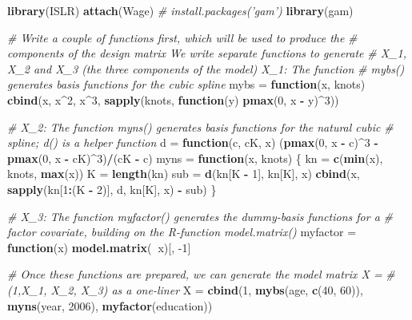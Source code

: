 \documentclass[]{article}
\newenvironment{Shaded}{\begin{snugshade}}{\end{snugshade}}
\newcommand{\CommentTok}[1]{\textcolor[rgb]{0.56,0.35,0.01}{\textit{#1}}}
\newcommand{\ControlFlowTok}[1]{\textcolor[rgb]{0.13,0.29,0.53}{\textbf{#1}}}
\newcommand{\DecValTok}[1]{\textcolor[rgb]{0.00,0.00,0.81}{#1}}
\newcommand{\KeywordTok}[1]{\textcolor[rgb]{0.13,0.29,0.53}{\textbf{#1}}}
\newcommand{\NormalTok}[1]{#1}
\newcommand{\OperatorTok}[1]{\textcolor[rgb]{0.81,0.36,0.00}{\textbf{#1}}}
\newcommand{\StringTok}[1]{\textcolor[rgb]{0.31,0.60,0.02}{#1}}
\begin{document}
\begin{Shaded}
\begin{Highlighting}[]
\KeywordTok{library}\NormalTok{(ISLR)}
\KeywordTok{attach}\NormalTok{(Wage)}
\CommentTok{# install.packages('gam')}
\KeywordTok{library}\NormalTok{(gam)}

\CommentTok{# Write a couple of functions first, which will be used to produce the}
\CommentTok{# components of the design matrix We write separate functions to generate}
\CommentTok{# X_1, X_2 and X_3 (the three components of the model) X_1: The function}
\CommentTok{# mybs() generates basis functions for the cubic spline}
\NormalTok{mybs =}\StringTok{ }\ControlFlowTok{function}\NormalTok{(x, knots) }\KeywordTok{cbind}\NormalTok{(x, x}\OperatorTok{^}\DecValTok{2}\NormalTok{, x}\OperatorTok{^}\DecValTok{3}\NormalTok{, }\KeywordTok{sapply}\NormalTok{(knots, }\ControlFlowTok{function}\NormalTok{(y) }\KeywordTok{pmax}\NormalTok{(}\DecValTok{0}\NormalTok{, }
\NormalTok{    x }\OperatorTok{-}\StringTok{ }\NormalTok{y)}\OperatorTok{^}\DecValTok{3}\NormalTok{))}

\CommentTok{# X_2: The function myns() generates basis functions for the natural cubic}
\CommentTok{# spline; d() is a helper function}
\NormalTok{d =}\StringTok{ }\ControlFlowTok{function}\NormalTok{(c, cK, x) (}\KeywordTok{pmax}\NormalTok{(}\DecValTok{0}\NormalTok{, x }\OperatorTok{-}\StringTok{ }\NormalTok{c)}\OperatorTok{^}\DecValTok{3} \OperatorTok{-}\StringTok{ }\KeywordTok{pmax}\NormalTok{(}\DecValTok{0}\NormalTok{, x }\OperatorTok{-}\StringTok{ }\NormalTok{cK)}\OperatorTok{^}\DecValTok{3}\NormalTok{)}\OperatorTok{/}\NormalTok{(cK }\OperatorTok{-}\StringTok{ }\NormalTok{c)}
\NormalTok{myns =}\StringTok{ }\ControlFlowTok{function}\NormalTok{(x, knots) \{}
\NormalTok{    kn =}\StringTok{ }\KeywordTok{c}\NormalTok{(}\KeywordTok{min}\NormalTok{(x), knots, }\KeywordTok{max}\NormalTok{(x))}
\NormalTok{    K =}\StringTok{ }\KeywordTok{length}\NormalTok{(kn)}
\NormalTok{    sub =}\StringTok{ }\KeywordTok{d}\NormalTok{(kn[K }\OperatorTok{-}\StringTok{ }\DecValTok{1}\NormalTok{], kn[K], x)}
    \KeywordTok{cbind}\NormalTok{(x, }\KeywordTok{sapply}\NormalTok{(kn[}\DecValTok{1}\OperatorTok{:}\NormalTok{(K }\OperatorTok{-}\StringTok{ }\DecValTok{2}\NormalTok{)], d, kn[K], x) }\OperatorTok{-}\StringTok{ }\NormalTok{sub)}
\NormalTok{\}}

\CommentTok{# X_3: The function myfactor() generates the dummy-basis functions for a}
\CommentTok{# factor covariate, building on the R-function model.matrix()}
\NormalTok{myfactor =}\StringTok{ }\ControlFlowTok{function}\NormalTok{(x) }\KeywordTok{model.matrix}\NormalTok{(}\OperatorTok{~}\NormalTok{x)[, }\DecValTok{-1}\NormalTok{]}

\CommentTok{# Once these functions are prepared, we can generate the model matrix X =}
\CommentTok{# (1,X_1, X_2, X_3) as a one-liner}
\NormalTok{X =}\StringTok{ }\KeywordTok{cbind}\NormalTok{(}\DecValTok{1}\NormalTok{, }\KeywordTok{mybs}\NormalTok{(age, }\KeywordTok{c}\NormalTok{(}\DecValTok{40}\NormalTok{, }\DecValTok{60}\NormalTok{)), }\KeywordTok{myns}\NormalTok{(year, }\DecValTok{2006}\NormalTok{), }\KeywordTok{myfactor}\NormalTok{(education))}
\end{Highlighting}
\end{Shaded}
\end{document}
